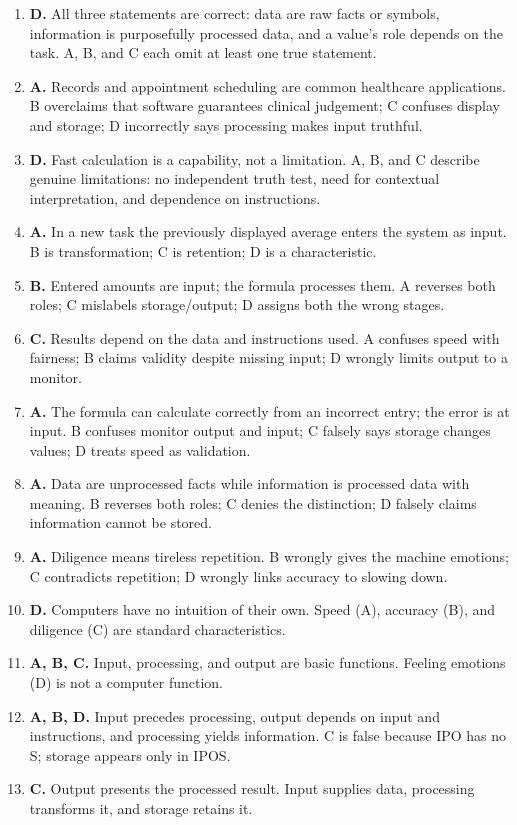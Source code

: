 \begin{enumerate}[label=\textbf{Q\arabic*.}, leftmargin=*]
  D describes input-output quality.
\item \textbf{D.} All three statements are correct: data are raw facts or
  symbols, information is purposefully processed data, and a value's role
  depends on the task. A, B, and C each omit at least one true statement.
\item \textbf{A.} Records and appointment scheduling are common healthcare
  applications. B overclaims that software guarantees clinical judgement; C
  confuses display and storage; D incorrectly says processing makes input
  truthful.
\item \textbf{D.} Fast calculation is a capability, not a limitation. A, B,
  and C describe genuine limitations: no independent truth test, need for
  contextual interpretation, and dependence on instructions.
\item \textbf{A.} In a new task the previously displayed average enters the
  system as input. B is transformation; C is retention; D is a characteristic.
\item \textbf{B.} Entered amounts are input; the formula processes them. A
  reverses both roles; C mislabels storage/output; D assigns both the wrong
  stages.
\item \textbf{C.} Results depend on the data and instructions used. A
  confuses speed with fairness; B claims validity despite missing input; D
  wrongly limits output to a monitor.
\item \textbf{A.} The formula can calculate correctly from an incorrect
  entry; the error is at input. B confuses monitor output and input; C
  falsely says storage changes values; D treats speed as validation.

\item \textbf{A.} Data are unprocessed facts while information is processed data with meaning. B reverses both roles; C denies the distinction; D falsely claims information cannot be stored.
\item \textbf{A.} Diligence means tireless repetition. B wrongly gives the machine emotions; C contradicts repetition; D wrongly links accuracy to slowing down.
\item \textbf{D.} Computers have no intuition of their own. Speed (A), accuracy (B), and diligence (C) are standard characteristics.
\item \textbf{A, B, C.} Input, processing, and output are basic functions. Feeling emotions (D) is not a computer function.
\item \textbf{A, B, D.} Input precedes processing, output depends on input and instructions, and processing yields information. C is false because IPO has no S; storage appears only in IPOS.
\item \textbf{C.} Output presents the processed result. Input supplies data, processing transforms it, and storage retains it.


\end{enumerate}
